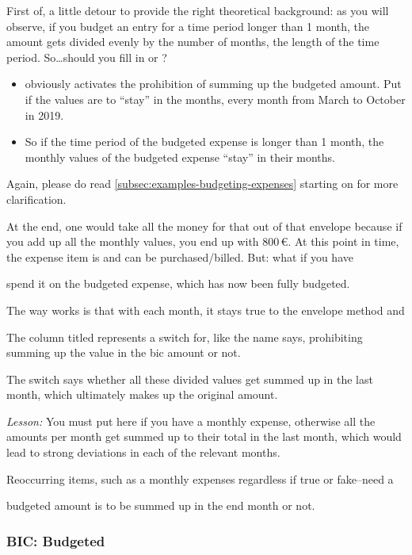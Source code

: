First of, a little detour to provide the right theoretical background: as you will observe, if you budget an entry for a time period longer than 1 month, the amount gets divided evenly by the number of months, \ie the length of the time period.
So\ldots should you fill in  or ?
\begin{itemize}
	\item {} obviously activates the prohibition of summing up the budgeted amount.
	Put  if the values are to ``stay'' in the months, \ie every month from March to October in 2019.
	\item {}
	So if the time period of the budgeted expense is longer than 1 month, the monthly values of the budgeted expense ``stay'' in their months.
\end{itemize}
Again, please do read \autoref{subsec:examples-budgeting-expenses} starting on  for more clarification.



At the end, one would take all the money for that out of that envelope because if you add up all the monthly values, you end up with 800\,€.
At this point in time, the expense item is  and can be purchased/billed.
But: what if you have 

spend it on the budgeted expense, which has now been fully budgeted.

The way \tfn works is that with each month, it stays true to the envelope method and 

The column titled  represents a switch for, like the name says, prohibiting summing up the value in the \ac{bic} amount or not.


The switch says whether all these divided values get summed up in the last month, which ultimately makes up the original amount.



\emph{Lesson:} You must put  here if you have a monthly expense, otherwise all the amounts per month get summed up to their total in the last month, which would lead to strong deviations in each of the relevant months.

Reoccurring items, such as a monthly expenses regardless if true or fake--need a 

		budgeted amount is to be summed up in the end month or not.

\subsubsection{BIC: Budgeted}
\label{subsubsec:budgeting-item-column-budgeted}

